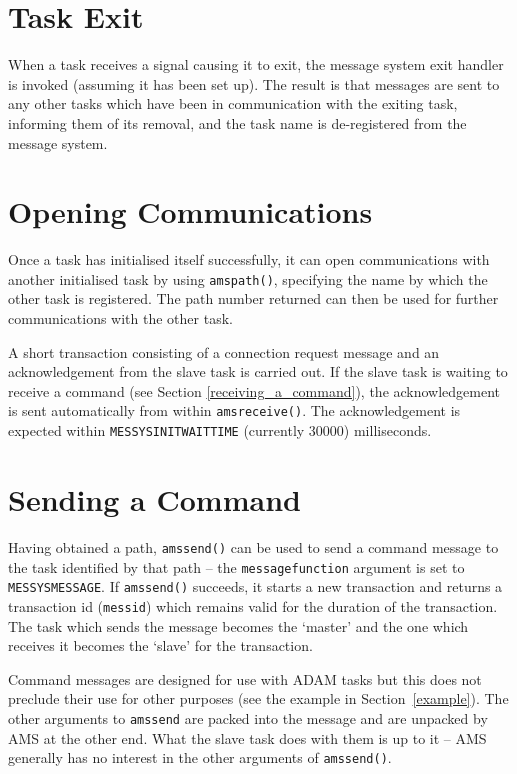\documentclass[twoside,11pt]{article}
\newcommand{\htmlref}[2]{#1}
\newcommand{\latex}[1]{#1}
\renewcommand{\_}{\texttt{\symbol{95}}}
\begin{document}
\section{Task Exit}
When a task receives a signal causing it to exit, the message system exit
handler is invoked (assuming it has been set up).
The result is that messages are sent to any other tasks which have been in
communication with the exiting task, informing them of its removal, and the
task name is de-registered from the message system.

\section{Opening Communications}
Once a task has initialised itself successfully, it can open communications
with another initialised task by using
\htmlref{\texttt{ams\_path()}}{AMS_PATH},
specifying the name by which the other task is registered.
The path number returned can then be used for further communications with the
other task.

A short transaction consisting of a connection request message and an
acknowledgement from the slave task is carried out. 
If the slave task is
\htmlref{waiting to receive a command}
{receiving_a_command}\latex{ (see Section \ref{receiving_a_command})},
the acknowledgement is sent automatically from within 
\htmlref{\texttt{ams\_receive()}}{AMS_RECEIVE}.
The acknowledgement is expected within \texttt{MESSYS\_\_INIT\_WAIT\_TIME}
(currently 30000) milliseconds.

\section{\label{sending_a_command}Sending a Command}
Having obtained a path,
\htmlref{\texttt{ams\_send()}}{AMS_SEND}
can be used to send a command message to the task identified by that path --
the \texttt{message\_function} argument is set to \texttt{MESSYS\_\_MESSAGE}.
If \texttt{ams\_send()} succeeds, it starts a new transaction and returns
a transaction id (\texttt{messid}) which remains valid for the duration of the
transaction. The task which sends the message becomes the `master' and
the one which receives it becomes the `slave' for the transaction.

Command messages are designed for use with ADAM tasks but this does not
preclude their use for other purposes (see the 
\htmlref{example}{example}\latex{ in Section~\ref{example}}).
The other arguments to \texttt{ams\_send} are packed into the message and are
unpacked by AMS at the other end.
What the slave task does with them is up to it -- AMS generally has no
interest in the other arguments of \texttt{ams\_send()}.
\end{document}
